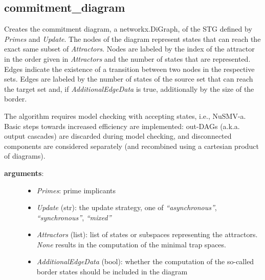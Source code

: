 \documentclass[letterpaper,10pt,english]{sphinxmanual}
\begin{document}
\subsection{commitment\_diagram}
\label{Basins:id4}\label{Basins:commitment-diagram}

\begin{fulllineitems}
\label{Basins:PyBoolNet.Basins.commitment_diagram}
Creates the commitment diagram, a networkx.DiGraph, of the STG defined by \emph{Primes} and \emph{Update}.
The nodes of the diagram represent states that can reach the exact same subset of \emph{Attractors}.
Nodes are labeled by the index of the attractor in the order given in \emph{Attractors} and the number of states
that are represented. Edges indicate the existence of a transition between two nodes in the respective sets.
Edges are labeled by the number of states of the source set that can reach the target set and,
if \emph{AdditionalEdgeData} is true, additionally by the size of the border.

The algorithm requires model checking with accepting states, i.e., NuSMV-a.
Basic steps towards increased efficiency are implemented:
out-DAGs (a.k.a. output cascades) are discarded during model checking, and
disconnected components are considered separately (and recombined using a cartesian product of diagrams).
\begin{description}
\item[{\textbf{arguments}:}] \leavevmode\begin{itemize}
\item {} 
\emph{Primes}: prime implicants

\item {} 
\emph{Update} (str): the update strategy, one of \emph{``asynchronous''}, \emph{``synchronous''}, \emph{``mixed''}

\item {} 
\emph{Attractors} (list): list of states or subspaces representing the attractors. \emph{None} results in the computation of the minimal trap spaces.

\item {} 
\emph{AdditionalEdgeData} (bool): whether the computation of the so-called border states should be included in the diagram


\end{itemize}
\end{description}
\end{fulllineitems}
\end{document}
